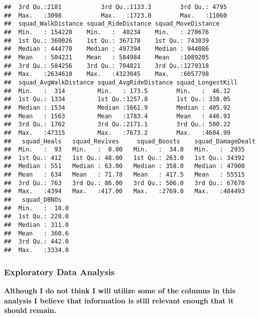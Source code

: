 \documentclass[]{article}
\begin{document}
\begin{verbatim}
##  3rd Qu.:2181           3rd Qu.:1133.3        3rd Qu.: 4795  
##  Max.   :3098           Max.   :1723.0        Max.   :11060  
##  squad_WalkDistance squad_RideDistance squad_MoveDistance
##  Min.   : 154228    Min.   :  40234    Min.   : 270676   
##  1st Qu.: 360026    1st Qu.: 367178    1st Qu.: 743039   
##  Median : 444770    Median : 497394    Median : 944086   
##  Mean   : 504221    Mean   : 584984    Mean   :1089205   
##  3rd Qu.: 584256    3rd Qu.: 704821    3rd Qu.:1279318   
##  Max.   :2634610    Max.   :4323045    Max.   :6057798   
##  squad_AvgWalkDistance squad_AvgRideDistance squad_LongestKill
##  Min.   :  314         Min.   : 173.5        Min.   :  46.12  
##  1st Qu.: 1334         1st Qu.:1257.8        1st Qu.: 338.05  
##  Median : 1534         Median :1661.9        Median : 405.92  
##  Mean   : 1563         Mean   :1783.4        Mean   : 446.93  
##  3rd Qu.: 1762         3rd Qu.:2171.1        3rd Qu.: 500.22  
##  Max.   :47315         Max.   :7673.2        Max.   :4604.99  
##   squad_Heals   squad_Revives     squad_Boosts    squad_DamageDealt
##  Min.   :  93   Min.   :  0.00   Min.   :  34.0   Min.   :  2935   
##  1st Qu.: 412   1st Qu.: 48.00   1st Qu.: 263.0   1st Qu.: 34392   
##  Median : 551   Median : 63.00   Median : 358.0   Median : 47900   
##  Mean   : 634   Mean   : 71.78   Mean   : 417.5   Mean   : 55515   
##  3rd Qu.: 763   3rd Qu.: 86.00   3rd Qu.: 506.0   3rd Qu.: 67670   
##  Max.   :4394   Max.   :417.00   Max.   :2769.0   Max.   :484493   
##   squad_DBNOs    
##  Min.   :  10.0  
##  1st Qu.: 220.0  
##  Median : 311.0  
##  Mean   : 360.6  
##  3rd Qu.: 442.0  
##  Max.   :3334.0
\end{verbatim}

\subsubsection{Exploratory Data
Analysis}\label{exploratory-data-analysis}

\textbf{Although I do not think I will utilize some of the columns in
this analysis I believe that information is still relevant enough that
it should remain.}
\end{document}
